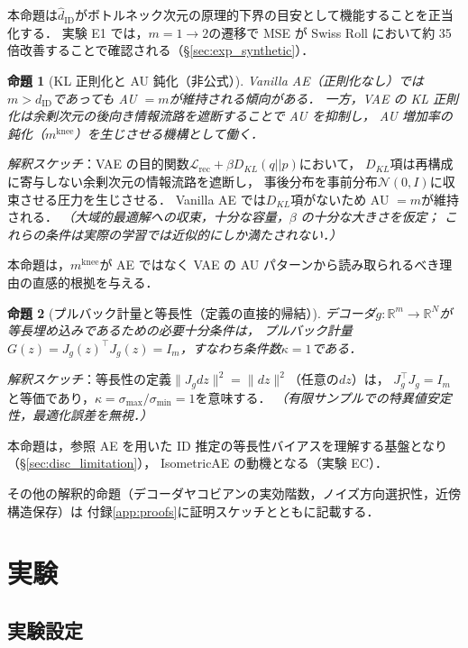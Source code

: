 \documentclass[11pt,a4paper]{jsarticle}
\newtheorem{proposition}{命題}
\newcommand{\dID}{d_{\mathrm{ID}}}
\newcommand{\Jg}{J_g}
\newcommand{\R}{\mathbb{R}}
\newcommand{\kap}{\kappa}
\newcommand{\mknee}{m^{\mathrm{knee}}}
\begin{document}
本命題は$\hat{d}_\mathrm{ID}$がボトルネック次元の原理的下界の目安として機能することを正当化する．
実験 E1 では，$m = 1 \to 2$の遷移で MSE が Swiss Roll において約 35 倍改善することで確認される（§\ref{sec:exp_synthetic}）．

\begin{proposition}[KL 正則化と AU 鈍化（非公式）]\label{thm:au}
Vanilla AE（正則化なし）では$m > \dID$であっても AU $= m$が維持される傾向がある．
一方，VAE の KL 正則化は余剰次元の後向き情報流路を遮断することで AU を抑制し，
AU 増加率の鈍化（$\mknee$）を生じさせる機構として働く．
\end{proposition}

\textit{解釈スケッチ}：VAE の目的関数$\mathcal{L}_{\mathrm{rec}} + \beta D_{KL}(q||p)$において，
$D_{KL}$項は再構成に寄与しない余剰次元の情報流路を遮断し，
事後分布を事前分布$\mathcal{N}(0,I)$に収束させる圧力を生じさせる．
Vanilla AE では$D_{KL}$項がないため AU $= m$が維持される．
\textit{（大域的最適解への収束，十分な容量，$\beta$ の十分な大きさを仮定；
これらの条件は実際の学習では近似的にしか満たされない．）}

本命題は，$\mknee$が AE ではなく VAE の AU パターンから読み取られるべき理由の直感的根拠を与える．

\begin{proposition}[プルバック計量と等長性（定義の直接的帰結）]\label{thm:pullback}
デコーダ$g: \R^m \to \R^N$が等長埋め込みであるための必要十分条件は，
プルバック計量$G(z) = \Jg(z)^\top \Jg(z) = I_m$，すなわち条件数$\kap = 1$である．
\end{proposition}

\textit{解釈スケッチ}：等長性の定義$\|J_g dz\|^2 = \|dz\|^2$（任意の$dz$）は，
$J_g^\top J_g = I_m$と等価であり，$\kap = \sigma_{\max}/\sigma_{\min} = 1$を意味する．
\textit{（有限サンプルでの特異値安定性，最適化誤差を無視．）}

本命題は，参照 AE を用いた ID 推定の等長性バイアスを理解する基盤となり（§\ref{sec:disc_limitation}），
IsometricAE の動機となる（実験 EC）．

その他の解釈的命題（デコーダヤコビアンの実効階数，ノイズ方向選択性，近傍構造保存）は
付録\ref{app:proofs}に証明スケッチとともに記載する．

\section{実験}\label{sec:exp}

\subsection{実験設定}\label{sec:exp_setup}
\end{document}
